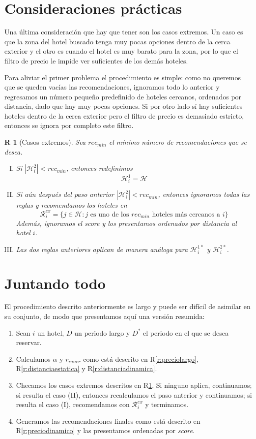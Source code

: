 \documentclass[12pt]{report}
\newcommand{\HH}{\mathcal{H}}
\newcommand{\RR}{\mathcal{R}}
\newtheorem{regla}{R}%
\begin{document}
\section{Consideraciones prácticas}

Una última consideración que hay que tener son los casos extremos. Un caso es que la zona del hotel buscado tenga muy pocas opciones dentro de la cerca exterior y el otro es cuando el hotel es muy barato para la zona, por lo que el filtro de precio le impide ver suficientes de los demás hoteles.

Para aliviar el primer problema el procedimiento es simple: como no queremos que se queden vacías las recomendaciones, ignoramos todo lo anterior y regresamos un número pequeño predefinido de hoteles cercanos, ordenados por distancia, dado que hay muy pocas opciones. Si por otro lado sí hay suficientes hoteles dentro de la cerca exterior pero el filtro de precio es demasiado estricto, entonces se ignora por completo este filtro.
\begin{regla}[Casos extremos] \label{r:casosextremos}
Sea $rec_{min}$ el mínimo número de recomendaciones que se desea.
\begin{enumerate}[(I)]
	\item Si $|\HH_i^2| < rec_{min}$, entonces redefinimos
		\[
			\HH_i^1 = \HH
		\]
	\item Si aún después del paso anterior $|\HH_i^2| < rec_{min}$, entonces ignoramos todas las reglas y recomendamos los hoteles en
	\[
		\RR_i^{ex} = \{j \in \HH : j \text{ es uno de los } rec_{min} \text{ hoteles más cercanos a } i\}
	\]
	Además, ignoramos el score y los presentamos ordenados por distancia al hotel $i$.
	\item Las dos reglas anteriores aplican de manera análoga para $\HH_i^{1*}$ y $\HH_i^{2*}$.
\end{enumerate}
\end{regla}

\section{Juntando todo}

El procedimiento descrito anteriormente es largo y puede ser difícil de asimilar en su conjunto, de modo que presentamos aquí una versión resumida:
\begin{enumerate}
	\item Sean $i$ un hotel, $D$ un periodo largo y $D^*$ el periodo en el que se desea reservar.
	\item Calculamos $\alpha$ y $r_{inner}$ como está descrito en R\ref{r:preciolargo}, R\ref{r:distanciaestatica} y R\ref{r:distanciadinamica}.
	\item Checamos los casos extremos descritos en R\ref{r:casosextremos}. Si ninguno aplica, continuamos; si resulta el caso (II), entonces recalculamos el paso anterior y continuamos; si resulta el caso (I), recomendamos con $\RR_i^{ex}$ y terminamos.
	\item Generamos las recomendaciones finales como está descrito en R\ref{r:preciodinamico} y las presentamos ordenadas por \emph{score}.
\end{enumerate}
\end{document}
